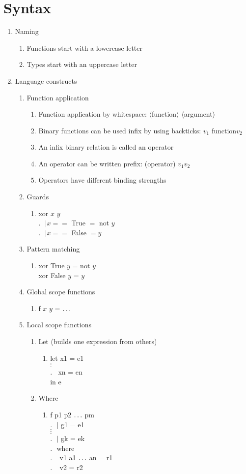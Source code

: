\documentclass[10pt]{article}
\newcommand{\enumstart}{\begin{enumerate}}
\newcommand{\enumend}{\end{enumerate}}
\newcommand{\backtick}{\textasciigrave}
\begin{document}
\section{Syntax}
\enumstart
	\item Naming
	\enumstart
		\item Functions start with a lowercase letter
		\item Types start with an uppercase letter
	\enumend
	\item Language constructs
	\enumstart
		\item Function application
		\enumstart
			\item Function application by whitespace: $\langle$function$\rangle$ $\langle$argument$\rangle$
			\item Binary functions can be used infix by using backticks: $v_1$ \backtick function\backtick $v_2$
			\item An infix binary relation is called an operator
			\item An operator can be written prefix: (operator) $v_1 v_2$
			\item Operators have different binding strengths
		\enumend
		\item Guards
		\enumstart
			\item xor $x$ $y$\\ $.\ \ \ | x ==$ True $=$ not $y$\\ $.\ \ \ | x ==$ False $= y$
		\enumend
		\item Pattern matching
		\enumstart
			\item xor True $y$ = not $y$\\xor False $y$ = $y$
		\enumend
		\item Global scope functions
		\enumstart
			\item f $x$ $y$ = $\mathellipsis$
		\enumend
		\item Local scope functions
		\enumstart
			\item Let (builds one expression from others)
			\enumstart
				\item let x1 = e1\\$\vdots$\\.$\ \ \ \ $xn = en\\in e
			\enumend
			\item Where
			\enumstart
				\item f p1 p2 $\mathellipsis$ pm\\.$\ \ \ |$ g1 = e1\\$\vdots$\\.$\ \ \ |$ gk = ek\\.$\ \ \ $where\\.$\ \ \ \ \ $v1 a1 $\mathellipsis$ an = r1\\.$\ \ \ \ \ $v2 = r2
			\enumend
		\enumend
	\enumend
\enumend
\end{document}
